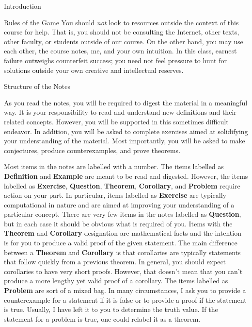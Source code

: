 \begin{chapter}{Introduction}
\begin{section}{Rules of the Game}
You should \emph{not} look to resources outside the context of this course for help. That is, you should not be consulting the Internet, other texts, other faculty, or students outside of our course. On the other hand, you may use each other, the course notes, me, and your own intuition.  In this class, earnest failure outweighs counterfeit success; you need not feel pressure to hunt for solutions outside your own creative and intellectual reserves.

\end{section}

\begin{section}{Structure of the Notes}

As you read the notes, you will be required to digest the material in a meaningful way.  It is your responsibility to read and understand new definitions and their related concepts.  However, you will be supported in this sometimes difficult endeavor. In addition, you will be asked to complete exercises aimed at solidifying your understanding of the material.  Most importantly, you will be asked to make conjectures, produce counterexamples, and prove theorems.

Most items in the notes are labelled with a number.  The items labelled as \textbf{Definition} and \textbf{Example} are meant to be read and digested.  However, the items labelled as \textbf{Exercise}, \textbf{Question}, \textbf{Theorem}, \textbf{Corollary}, and \textbf{Problem} require action on your part.  In particular, items labelled as \textbf{Exercise} are typically computational in nature and are aimed at improving your understanding of a particular concept.  There are very few items in the notes labelled as \textbf{Question}, but in each case it should be obvious what is required of you.  Items with the \textbf{Theorem} and \textbf{Corollary} designation are mathematical facts and the intention is for you to produce a valid proof of the given statement.  The main difference between a \textbf{Theorem} and \textbf{Corollary} is that corollaries are typically statements that follow quickly from a previous theorem.  In general, you should expect corollaries to have very short proofs.  However, that doesn't mean that you can't produce a more lengthy yet valid proof of a corollary.  The items labelled as \textbf{Problem} are sort of a mixed bag.  In many circumstances, I ask you to provide a counterexample for a statement if it is false or to provide a proof if the statement is true.  Usually, I have left it to you to determine the truth value.  If the statement for a problem is true, one could relabel it as a theorem.


\end{section}
\end{chapter}
